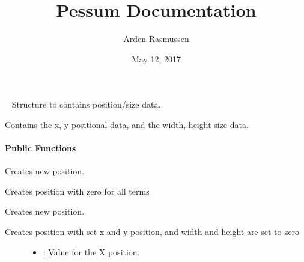 \documentclass[letterpaper,10pt,english]{sphinxmanual}
\title{Pessum Documentation}
\date{May 12, 2017}
\author{Arden Rasmussen}
\begin{document}
\maketitle
\sphinxtableofcontents
{}\label{\detokenize{index::doc}}


\begin{fulllineitems}
\label{\detokenize{index:_CPPv2N7ostendo3PosE}}%
\pysigstartmultiline
{}\label{\detokenize{index:Pessumstructostendo_1_1Pos}}%
\pysigstopmultiline~
Structure to contains position/size data. 

Contains the x, y positional data, and the width, height size data. 
\paragraph{Public Functions}

\begin{fulllineitems}
\label{\detokenize{index:_CPPv2N7ostendo3Pos3PosEv}}%
\pysigstartmultiline
{}\label{\detokenize{index:Pessumstructostendo_1_1Pos_1a6d76a3381e3fa97a8491907f028e9584}}%
\pysigstopmultiline
Creates new position. 

Creates position with zero for all terms 

\end{fulllineitems}


\begin{fulllineitems}
\label{\detokenize{index:_CPPv2N7ostendo3Pos3PosEii}}%
\pysigstartmultiline
{}\label{\detokenize{index:Pessumstructostendo_1_1Pos_1a2a22e8ea6064992f404769b93f685669}}%
\pysigstopmultiline
Creates new position. 

Creates position with set x and y position, and width and height are set to zero \begin{description}
\item[{}] \leavevmode\begin{itemize}
\item {} 
: Value for the X position. 


\end{itemize}
\end{description}
\end{fulllineitems}
\end{fulllineitems}
\end{document}

